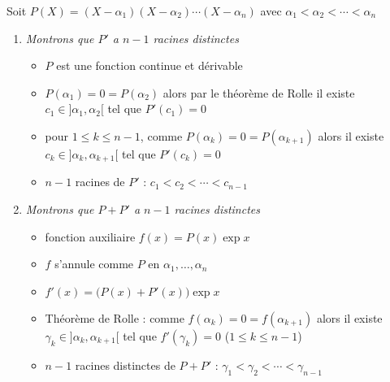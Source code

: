 \begin{frame}
\begin{exemple}
Soit $P(X) = (X-\alpha_1)(X-\alpha_2)\cdots(X-\alpha_n)$
avec $\alpha_1< \alpha_2 < \cdots < \alpha_n$
\pause
\begin{enumerate}
  \item \emph{Montrons que $P'$ a $n-1$ racines distinctes}
\pause
  \begin{itemize}
    \item $P$ est une fonction continue et dérivable
\pause
    \item $P(\alpha_1)=0=P(\alpha_2)$ alors par le théorème de Rolle 
il existe $c_1 \in ]\alpha_1,\alpha_2[$ tel que $P'(c_1)=0$
\pause
    \item  pour $1 \le k \le n-1$, comme $P(\alpha_k)=0=P(\alpha_{k+1})$ alors
il existe $c_k \in ]\alpha_k,\alpha_{k+1}[$ tel que $P'(c_k)=0$
\pause
    \item $n-1$ racines de $P'$ : $c_1< c_2 < \cdots < c_{n-1}$
  \end{itemize}
\pause
  \item \emph{Montrons que $P+P'$ a $n-1$ racines distinctes}
  \begin{itemize}
\pause
    \item fonction auxiliaire $f(x)=P(x)\exp x$
\pause
    \item $f$ s'annule comme $P$ en $\alpha_1,\ldots,\alpha_n$
\pause
    \item $f'(x)=\big(P(x)+P'(x)\big) \exp x$
\pause
    \item Théorème de Rolle :  comme $f(\alpha_k)=0=f(\alpha_{k+1})$ alors
il existe $\gamma_k \in ]\alpha_k,\alpha_{k+1}[$ tel que $f'(\gamma_k)=0$ ($1 \le k \le n-1$)
\pause
    \item $n-1$ racines distinctes de $P+P'$ : $\gamma_1 < \gamma_2 < \cdots < \gamma_{n-1}$
  \end{itemize}
\end{enumerate}
\end{exemple}

\end{frame}

